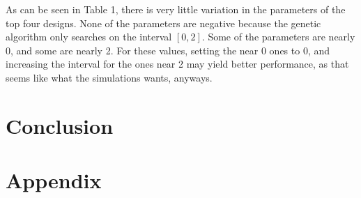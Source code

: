 \documentclass[a4paper,12pt]{report}
\begin{document}
\begin{table}[H]
\caption{Design Parameters and Cost of the Best Designs}
\end{table}

As can be seen in Table 1, there is very little variation in the parameters of the top four designs. None of the parameters are negative because the genetic algorithm only searches on the interval $[0, 2]$. Some of the parameters are nearly 0, and some are nearly 2. For these values, setting the near 0 ones to 0, and increasing the interval for the ones near 2 may yield better performance, as that seems like what the simulations wants, anyways.

\section{Conclusion}


\section{Appendix}
\end{document}
